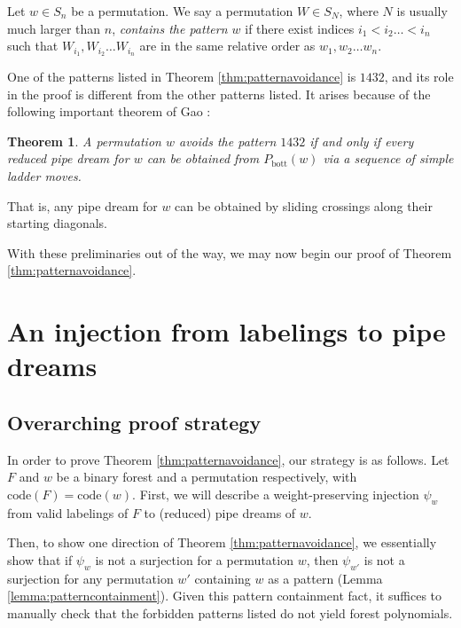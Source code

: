 \documentclass{article}
\newtheorem{theorem}{Theorem}[section]
\theoremstyle{definition} %
\begin{document}
Let $w \in S_n$ be a permutation. We say a permutation $W \in S_N$, where $N$ is usually much larger than $n$, \textit{contains the pattern $w$} if there exist indices $i_1 < i_2 \dots < i_n$ such that $W_{i_1}, W_{i_2} \dots W_{i_n}$ are in the same relative order as $w_1, w_2 \dots w_n$. 

One of the patterns listed in Theorem \ref{thm:patternavoidance} is $1432$, and its role in the proof is different from the other patterns listed. It arises because of the following important theorem of Gao \cite{principalspecializations}:
\vspace{1em}

\begin{theorem}\label{thm:1432simple}
    A permutation $w$ avoids the pattern $1432$ if and only if every reduced pipe dream for $w$ can be obtained from $P_{\text{bott}}(w)$ via a sequence of \textit{simple} ladder moves.
\end{theorem}

That is, any pipe dream for $w$ can be obtained by sliding crossings along their starting diagonals. 


With these preliminaries out of the way, we may now begin our proof of Theorem \ref{thm:patternavoidance}. 

\section{An injection from labelings to pipe dreams}

\subsection{Overarching proof strategy}

In order to prove Theorem \ref{thm:patternavoidance}, our strategy is as follows. Let $F$ and $w$ be a binary forest and a permutation respectively, with $\text{code}(F) = \text{code}(w)$. First, we will describe a weight-preserving injection $\psi_w$ from valid labelings of $F$ to (reduced) pipe dreams of $w$. 

Then, to show one direction of Theorem \ref{thm:patternavoidance}, we essentially show that if $\psi_w$ is not a surjection for a permutation $w$, then $\psi_{w'}$ is not a surjection for any permutation $w'$ containing $w$ as a pattern (Lemma \ref{lemma:patterncontainment}). Given this pattern containment fact, it suffices to manually check that the forbidden patterns listed do not yield forest polynomials. 
\end{document}
